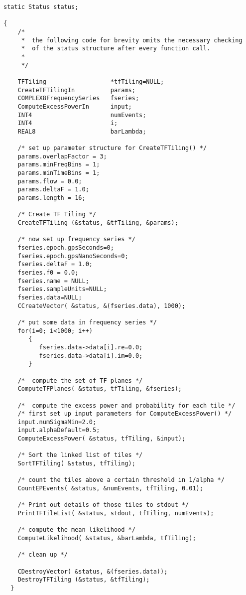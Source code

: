 \documentclass{article}
\begin{document}
\begin{verbatim}
static Status status;

{
    /*  
     *  the following code for brevity omits the necessary checking 
     *  of the status structure after every function call.
     *
     */

    TFTiling                  *tfTiling=NULL;
    CreateTFTilingIn          params;
    COMPLEX8FrequencySeries   fseries;
    ComputeExcessPowerIn      input;
    INT4                      numEvents;
    INT4                      i;
    REAL8                     barLambda;

    /* set up parameter structure for CreateTFTiling() */
    params.overlapFactor = 3;
    params.minFreqBins = 1;
    params.minTimeBins = 1;
    params.flow = 0.0;
    params.deltaF = 1.0;
    params.length = 16;

    /* Create TF Tiling */  
    CreateTFTiling (&status, &tfTiling, &params);

    /* now set up frequency series */
    fseries.epoch.gpsSeconds=0;
    fseries.epoch.gpsNanoSeconds=0;
    fseries.deltaF = 1.0;
    fseries.f0 = 0.0;
    fseries.name = NULL;
    fseries.sampleUnits=NULL;
    fseries.data=NULL;
    CCreateVector( &status, &(fseries.data), 1000);

    /* put some data in frequency series */
    for(i=0; i<1000; i++)
       {
          fseries.data->data[i].re=0.0;
          fseries.data->data[i].im=0.0;
       }

    /*  compute the set of TF planes */    
    ComputeTFPlanes( &status, tfTiling, &fseries);

    /*  compute the excess power and probability for each tile */
    /* first set up input parameters for ComputeExcessPower() */
    input.numSigmaMin=2.0;
    input.alphaDefault=0.5;
    ComputeExcessPower( &status, tfTiling, &input);

    /* Sort the linked list of tiles */
    SortTFTiling( &status, tfTiling);

    /* count the tiles above a certain threshold in 1/alpha */
    CountEPEvents( &status, &numEvents, tfTiling, 0.01);

    /* Print out details of those tiles to stdout */
    PrintTFTileList( &status, stdout, tfTiling, numEvents);      

    /* compute the mean likelihood */
    ComputeLikelihood( &status, &barLambda, tfTiling);

    /* clean up */

    CDestroyVector( &status, &(fseries.data));
    DestroyTFTiling (&status, &tfTiling);
  }
\end{verbatim}
\end{document}
